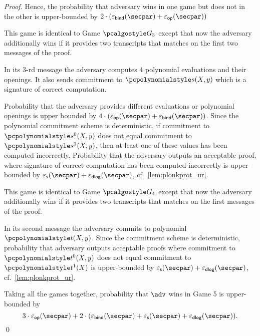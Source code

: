 {\begin{proof}
  Hence, the probability that adversary wins in one game but does not in the
  other is upper-bounded by $2 \cdot (\epsbind (\secpar) + \epsop (\secpar))$

   This game is identical to Game $\game{3}$ except that now the
  adversary additionally wins if it provides two transcripts that matches on the
  first two messages of the proof.

   In its $3$-rd message the adversary computes $4$ polynomial
  evaluations and their openings. It also sends commitment to $\p{s} (X, y)$ which is a
  signature of correct computation.

  Probability that the adversary provides different evaluations or polynomial openings is
  upper bounded by $4 \cdot (\epsop (\secpar) + \epsbind (\secpar))$. Since the polynomial
  commitment scheme is deterministic, if commitment to $\p{s^0} (X, y)$ does not equal
  commitment to $\p{s^1} (X, y)$, then at least one of these values has been computed
  incorrectly. Probability that the adversary outputs an acceptable proof, where signature
  of correct computation has been computed incorrectly is upper-bounded by $\epss
  (\secpar) + \epsdlog (\secpar)$, cf.~\cref{lem:plonkprot_ur}.

    This game is identical to Game $\game{4}$ except that now the
  adversary additionally wins if it provides two transcripts that matches on the
  first messages of the proof.

   In its second message the adversary commits to polynomial
  $\p{t} (X, y)$. Since the commitment scheme is deterministic, probability that adversary
  outputs acceptable proofs where commitment to $\p{t^0} (X, y)$ does not equal commitment
  to $\p{t^1} (X)$ is upper-bounded by $\epss (\secpar) + \epsdlog (\secpar)$, cf.~\cref{lem:plonkprot_ur}.

   Taking all the games together, probability that $\adv$ wins
  in Game 5 is upper-bounded by
  \[
    3 \cdot \epsop (\secpar) + 2 \cdot (\epsbind (\secpar) + \epss (\secpar) +
    \epsdlog (\secpar)).
  \]
  \qed
\end{proof}
}


